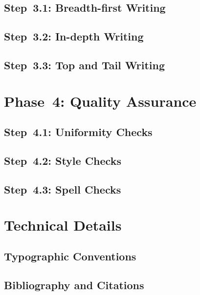 \documentclass[a4paper]{memoir}
\begin{document}
\subsection{Step~3.1: Breadth-first Writing}
\label{sec:bf-writing}

\subsection{Step~3.2: In-depth Writing}
\label{sec:id-writing}

\subsection{Step~3.3: Top and Tail Writing}
\label{sec:top-tail-writing}

\section{Phase~4: Quality Assurance}
\label{sec:phase-4:details}

\subsection{Step~4.1: Uniformity Checks}
\label{sec:uniformity-checks}

\subsection{Step~4.2: Style Checks}
\label{sec:style-checks}

\subsection{Step~4.3: Spell Checks}
\label{sec:spell-checks}

\section{Technical Details}
\label{sec:technical-details}

\subsection{Typographic Conventions}
\label{sec:typography}

\subsection{Bibliography and Citations}
\label{sec:bibliography}
\end{document}

